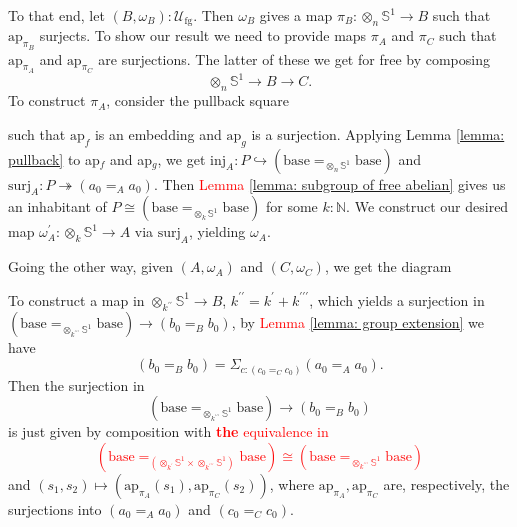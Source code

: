 \documentclass{article}
\newcommand{\n}{\mathbb{N}}
\newcommand{\Univfg}{\mathcal{U}_{\textrm{fg}}}
\newcommand{\0}{\mathbf{0}}
\newcommand{\1}{\mathbf{1}}
\newcommand{\pr}{^\prime}
\newcommand{\inj}{\hookrightarrow}
\newcommand{\surj}{\twoheadrightarrow}
\newcommand{\sone}{\mathbb{S}^1}
\newcommand{\base}{\textrm{base}}
\newcommand{\ap}[1]{\textrm{ap}_{#1}}
\begin{document}
To that end, let $(B, \omega_B) : \Univfg$. Then $\omega_B$ gives a map $\pi_B : \otimes_n \sone \to B$ such that $\ap{\pi_B}$ surjects. To show our result we need to provide maps $\pi_A$ and $\pi_C$ such that $\ap{\pi_A}$ and $\ap{\pi_C}$ are surjections. The latter of these we get for free by composing $$ \otimes_n \sone \to B \to C.$$
To construct $\pi_A$, consider the pullback square
\begin{center}
\end{center}
such that $\ap{f}$ is an embedding and $\ap{g}$ is a surjection. Applying Lemma \ref{lemma: pullback} to ap$_f$ and ap$_g$, we get $\textrm{inj}_A : P \inj (\base =_{\otimes_n \sone} \base)$ and $\textrm{surj}_A : P \surj (a_0 =_A a_0)$. Then \textcolor{red}{Lemma \ref{lemma: subgroup of free abelian}} gives us an inhabitant of $P \cong (\base =_{\otimes_k \sone} \base)$ for some $k : \n$. We construct our desired map $\omega_A\pr : \otimes_k \sone \to A$ via $\textrm{surj}_A$, yielding $\omega_A$.

Going the other way, given $(A, \omega_A)$ and $(C, \omega_C)$, we get the diagram

\begin{center}
\end{center}
To construct a map in $\otimes_{k^{\prime\prime}} \sone \to B$, $k^{\prime\prime} = k\pr + k^{\prime \prime \prime}$, which yields a surjection in $(\base =_{\otimes_{k^{\prime\prime\prime}} \sone} \base) \to (b_0 =_B b_0)$, by \textcolor{red}{Lemma \ref{lemma: group extension}} we have $$(b_0 =_B b_0) = \Sigma_{c : (c_0 =_C c_0)} (a_0 =_A a_0).$$Then the surjection in $$(\base =_{\otimes_{k^{\prime\prime\prime}} \sone} \base) \to (b_0 =_B b_0)$$ is just given by composition with \textcolor{red}{\textbf{the} equivalence in $$(\base =_{(\otimes_{k^{\prime}} \sone \times \otimes_{k^{\prime\prime\prime}} \sone)} \base) \cong (\base =_{\otimes_{k^{\prime\prime\prime}} \sone} \base)$$}and $(s_1,s_2) \mapsto (\ap{\pi_A}(s_1), \ap{\pi_C}(s_2))$, where $\ap{\pi_A},\ap{\pi_C}$ are, respectively, the surjections into $(a_0 =_A a_0)$ and $(c_0 =_C c_0)$.
\end{document}
